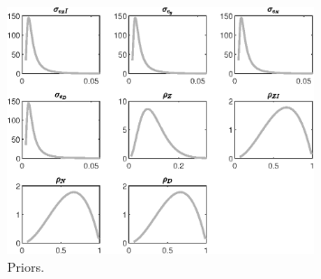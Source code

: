  
\begin{figure}[H]
\centering
\includegraphics[width=0.80\textwidth]{BRS_growth/graphs/BRS_growth_Priors1}
\caption{Priors.}\label{Fig:Priors:1}
\end{figure}
 
